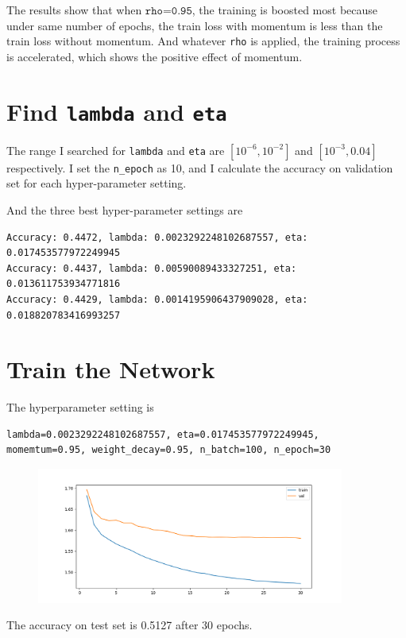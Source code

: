 The results show that when $\texttt{rho=0.95}$, the training is boosted most because under same number of epochs, the train loss with momentum is less than the train loss without momentum. And whatever \texttt{rho} is applied, the training process is accelerated, which shows the positive effect of momentum.

\section{Find \texttt{lambda} and \texttt{eta}}

The range I searched for \texttt{lambda} and \texttt{eta} are $[10^{-6}, 10^{-2}]$ and $[10^{-3}, 0.04]$ respectively. I set the \texttt{n\_epoch} as 10, and I calculate the accuracy on validation set for each hyper-parameter setting.

And the three best hyper-parameter settings are

\begin{verbatim}
Accuracy: 0.4472, lambda: 0.0023292248102687557, eta: 0.017453577972249945
Accuracy: 0.4437, lambda: 0.00590089433327251, eta: 0.013611753934771816
Accuracy: 0.4429, lambda: 0.0014195906437909028, eta: 0.018820783416993257
\end{verbatim} 

\section{Train the Network}

The hyperparameter setting is 
\begin{verbatim}
lambda=0.0023292248102687557, eta=0.017453577972249945, 
momemtum=0.95, weight_decay=0.95, n_batch=100, n_epoch=30
\end{verbatim}

\begin{figure}[h!]
	\centering
	\includegraphics[width=0.9\textwidth]{../Result_imgs/origin.png}
\end{figure}

The accuracy on test set is 0.5127 after 30 epochs.




